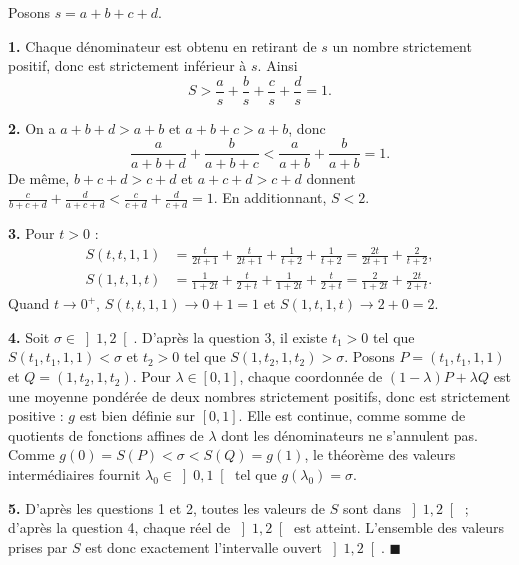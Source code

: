 Posons $s = a + b + c + d$.

\textbf{1.} Chaque dénominateur est obtenu en retirant de $s$ un nombre
strictement positif, donc est strictement inférieur à $s$. Ainsi
\[
S > \frac{a}{s} + \frac{b}{s} + \frac{c}{s} + \frac{d}{s} = 1.
\]

\textbf{2.} On a $a + b + d > a + b$ et $a + b + c > a + b$, donc
\[
\frac{a}{a+b+d} + \frac{b}{a+b+c} < \frac{a}{a+b} + \frac{b}{a+b} = 1.
\]
De même, $b + c + d > c + d$ et $a + c + d > c + d$ donnent
$\frac{c}{b+c+d} + \frac{d}{a+c+d} < \frac{c}{c+d} + \frac{d}{c+d} = 1$.
En additionnant, $S < 2$.

\textbf{3.} Pour $t > 0$ :
\[
\begin{aligned}
S(t, t, 1, 1) &= \frac{t}{2t+1} + \frac{t}{2t+1} + \frac{1}{t+2} + \frac{1}{t+2}
= \frac{2t}{2t+1} + \frac{2}{t+2}, \\
S(1, t, 1, t) &= \frac{1}{1+2t} + \frac{t}{2+t} + \frac{1}{1+2t} + \frac{t}{2+t}
= \frac{2}{1+2t} + \frac{2t}{2+t}.
\end{aligned}
\]
Quand $t \to 0^+$, $S(t, t, 1, 1) \to 0 + 1 = 1$ et $S(1, t, 1, t) \to 2 + 0 = 2$.

\textbf{4.} Soit $\sigma \in \left]1, 2\right[$. D'après la question 3, il
existe $t_1 > 0$ tel que $S(t_1, t_1, 1, 1) < \sigma$ et $t_2 > 0$ tel que
$S(1, t_2, 1, t_2) > \sigma$. Posons $P = (t_1, t_1, 1, 1)$ et
$Q = (1, t_2, 1, t_2)$. Pour $\lambda \in [0, 1]$, chaque coordonnée de
$(1-\lambda)P + \lambda Q$ est une moyenne pondérée de deux nombres
strictement positifs, donc est strictement positive : $g$ est bien définie
sur $[0, 1]$. Elle est continue, comme somme de quotients de fonctions
affines de $\lambda$ dont les dénominateurs ne s'annulent pas. Comme
$g(0) = S(P) < \sigma < S(Q) = g(1)$, le théorème des valeurs
intermédiaires fournit $\lambda_0 \in \left]0, 1\right[$ tel que
$g(\lambda_0) = \sigma$.

\textbf{5.} D'après les questions 1 et 2, toutes les valeurs de $S$ sont
dans $\left]1, 2\right[$ ; d'après la question 4, chaque réel de
$\left]1, 2\right[$ est atteint. L'ensemble des valeurs prises par $S$ est
donc exactement l'intervalle ouvert $\left]1, 2\right[$. \hfill $\blacksquare$
